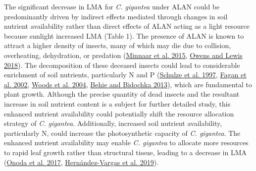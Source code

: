\documentclass[
  12pt,
  letterpaper,
  DIV=11,
  numbers=noendperiod]{scrartcl}
\begin{document}
The significant decrease in LMA for \emph{C. gigantea} under ALAN could
be predominantly driven by indirect effects mediated through changes in
soil nutrient availability rather than direct effects of ALAN acting as
a light resource because sunlight increased LMA (Table 1). The presence
of ALAN is known to attract a higher density of insects, many of which
may die due to collision, overheating, dehydration, or predation
(\protect\hyperlink{ref-Minnaar2015}{Minnaar et al. 2015},
\protect\hyperlink{ref-Owens2018}{Owens and Lewis 2018}). The
decomposition of these deceased insects could lead to considerable
enrichment of soil nutrients, particularly N and P
(\protect\hyperlink{ref-Schulze1997}{Schulze et al. 1997},
\protect\hyperlink{ref-Fagan2002}{Fagan et al. 2002},
\protect\hyperlink{ref-Woods2004}{Woods et al. 2004},
\protect\hyperlink{ref-Behie2013}{Behie and Bidochka 2013}), which are
fundamental to plant growth. Although the precise quantity of dead
insects and the resultant increase in soil nutrient content is a subject
for further detailed study, this enhanced nutrient availability could
potentially shift the resource allocation strategy of \emph{C.
gigantea}. Additionally, increased soil nutrient availability,
particularly N, could increase the photosynthetic capacity of \emph{C.
gigantea}. The enhanced nutrient availability may enable \emph{C.
gigantea} to allocate more resources to rapid leaf growth rather than
structural tissue, leading to a decrease in LMA
(\protect\hyperlink{ref-Onoda2017}{Onoda et al. 2017},
\protect\hyperlink{ref-Hernandez-Vargas2019}{Hernández-Vargas et al.
2019}).
\end{document}
